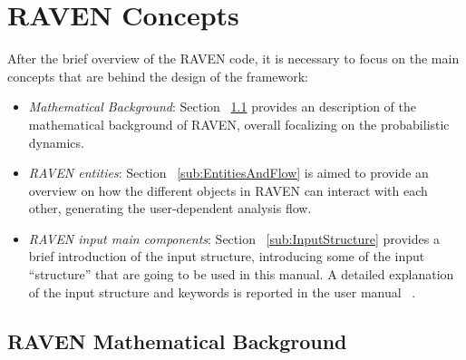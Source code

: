 \section{RAVEN Concepts}
\label{sec:RAVENconcept}
After the brief overview of the RAVEN code, it is necessary to focus on the main concepts that are behind the design of the framework:
\begin{itemize}
    \item \textit{Mathematical Background}: Section ~\ref{sub:mathBackground} provides an description of the mathematical background of RAVEN,
     overall focalizing on the probabilistic dynamics.
    \item \textit{RAVEN entities}: Section ~\ref{sub:EntitiesAndFlow} is aimed to provide an overview on how the different objects in
    RAVEN can interact with each other, generating the user-dependent analysis flow.
    \item \textit{RAVEN input main components}: Section ~\ref{sub:InputStructure} provides a brief introduction of the input structure, introducing
    some of the input ``structure'' that are going to be used in this manual. A detailed explanation of the
    input structure and keywords is reported in the user manual ~\cite{RAVENuserManual}.
\end{itemize}
\subsection{RAVEN Mathematical Background}
\label{sub:mathBackground}
